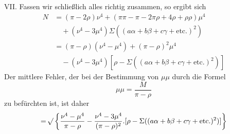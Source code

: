 VII. Fassen wir schließlich alles richtig zusammen, so ergibt sich
\[
\begin{aligned}
N&=(\pi-2\rho)\nu^4+(\pi\pi-\pi-2\pi\rho+4\rho+\rho\rho)\mu^4\\
&\quad+(\nu^4-3\mu^4)\Sigma((a\alpha+b\beta+c\gamma+\text{etc.})^2)\\
&=(\pi-\rho)(\nu^4-\mu^4)+(\pi-\rho)^2\mu^4\\
&\quad-(\nu^4-3\mu^4)[\rho-\Sigma((a\alpha+b\beta+c\gamma+\text{etc.})^2)]
\end{aligned}
\]
Der mittlere Fehler, der bei der Bestimmung von \(\mu\mu\) durch die Formel
\[
\mu\mu=\frac{M}{\pi-\rho}
\]
zu befürchten ist, ist daher
\[
=\mathord{{}^{}\!\surd}\left\{\frac{\nu^4-\mu^4}{\pi-\rho}-\frac{\nu^4-3\mu^4}{(\pi-\rho)^2}.[\rho-\Sigma((a\alpha+b\beta+c\gamma+\text{etc.})^2)]\right\}
\]

